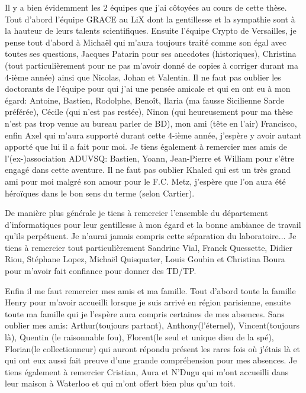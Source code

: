 \documentclass[10pt,a4paper]{book}
\theoremstyle{plain}
\theoremstyle{definition}
\theoremstyle{definition}
\theoremstyle{definition}
\theoremstyle{definition}
\theoremstyle{definition}
\theoremstyle{remark}
\theoremstyle{remark}
\theoremstyle{definition}
\begin{document}
Il y a bien évidemment les $2$ équipes que j'ai côtoyées au cours de cette 
thèse. Tout d'abord l'équipe GRACE au LiX dont la gentillesse et la sympathie
sont à la hauteur de leurs talents scientifiques. Ensuite l'équipe Crypto de 
Versailles, je pense tout d'abord à Michaël qui m'aura toujours traité comme 
son égal avec toutes ses questions, Jacques Patarin pour ses anecdotes 
(historiques), Christina (tout particulièrement pour ne pas m'avoir donné de 
copies à corriger durant ma $4$-ième année) ainsi que Nicolas, Johan et Valentin. 
Il ne faut pas oublier les doctorants de l'équipe pour qui j'ai une pensée 
amicale et qui en ont eu à mon égard: Antoine, Bastien, Rodolphe, Benoît, 
Ilaria (ma fausse Sicilienne Sarde préférée),  Cécile (qui n'est pas 
restée), Ninon (qui heureusement pour ma thèse n'est pas trop venue au bureau 
parler de BD), mon ami (tête en l'air) Francisco, enfin Axel qui m'aura 
supporté durant cette $4$-ième 
année, j'espère y avoir autant apporté que lui il a fait pour moi. Je tiens 
également à remercier mes amis de l'(ex-)association ADUVSQ: Bastien, Yoann, 
Jean-Pierre et William pour s'être engagé dans cette aventure. Il ne faut pas 
oublier Khaled qui est un très grand ami pour moi malgré son amour pour le F.C.
Metz, j'espère que l'on aura été héroïques dans le bon sens du terme (selon 
Cartier).

De manière plus générale je tiens à remercier l'ensemble du département 
d'informatiques pour leur gentillesse à mon égard et la bonne ambiance de 
travail qu'ils perpétuent. Je n'aurai jamais compris cette séparation du 
laboratoire... Je tiens à remercier tout particulièrement Sandrine Vial, 
Franck Quessette, Didier Riou, Stéphane Lopez, Michaël Quisquater, Louis Goubin
et Christina Boura pour m'avoir fait confiance pour donner des TD/TP.

Enfin il me faut remercier mes amis et ma famille. Tout d'abord toute la 
famille Henry pour m'avoir accueilli lorsque je suis arrivé en région 
parisienne, ensuite toute ma famille qui je l'espère aura compris certaines de
mes absences. Sans oublier mes amis: Arthur(toujours partant), 
Anthony(l'éternel), Vincent(toujours là), Quentin (le raisonnable fou), 
Florent(le seul et unique dieu de la spé), Florian(le collectionneur) qui 
auront répondu présent les rares fois où j'étais là et qui ont eux aussi fait 
preuve d'une grande compréhension pour mes absences. Je tiens également à 
remercier Cristian, Aura et N'Dugu qui m'ont accueilli dans leur maison à 
Waterloo et qui m'ont offert bien plus qu'un toit.
\end{document}
